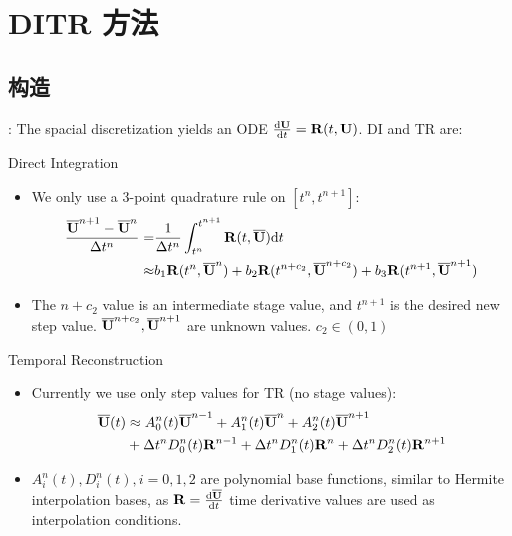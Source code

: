 \documentclass[aspectratio=169,serif]{beamer} %
\begin{document}
\section{DITR 方法}
\subsection{构造}


\begin{frame}[allowframebreaks]{\secname: \subsecname}
  The spacial discretization yields an ODE $\dv{\mathbf{U}}{t}=\mathbf{R}(t,\mathbf{U})$.
  DI and TR are:
  \begin{block}{Direct Integration}
    \begin{itemize}
      \item We only use a 3-point quadrature
            rule on $[t^n,t^{n+1}]$:
            \begin{equation}
              \label{eq:Quad3}
              \begin{aligned}
                \frac{\overline{\mathbf{U}}^{n+1} - \overline{\mathbf{U}}^{n}}{{\Delta} t^n} = & \frac{1}{{\Delta} t^n}
                \int_{t^n}^{t^{n+1}}{
                \mathbf{R}(t, \overline{\mathbf{U}}) \dd t
                }                                                           \\ \approx &
                b_1\mathbf{R}(t^n, \overline{\mathbf{U}}^n)
                +
                b_2\mathbf{R}(t^{n+c_2}, \overline{\mathbf{U}}^{n+c_2})
                +
                b_3\mathbf{R}(t^{n+1}, \overline{\mathbf{U}}^{n+1})
              \end{aligned}
            \end{equation}
      \item The ${n+c_2}$ value is an intermediate stage value, and $t^{n+1}$ is the desired new step value.
            $\overline{\mathbf{U}}^{n+c_2},\overline{\mathbf{U}}^{n+1}$ are unknown values.
            $c_2\in (0,1)$
    \end{itemize}
  \end{block}


  \begin{block}{Temporal Reconstruction}
    \begin{itemize}
      \item Currently we use only step values for TR (no stage values):
            \begin{equation}
              \begin{aligned}
                \label{eq:TR}
                \overline{\mathbf{U}}(t) & \approx
                A^n_0(t)\overline{\mathbf{U}}^{n - 1} +
                A^n_1(t)\overline{\mathbf{U}}^{n} +
                A^n_2(t)\overline{\mathbf{U}}^{n + 1}
                \\ & +
                {\Delta} t^n D^n_0(t)\mathbf{R}^{n - 1} +
                {\Delta} t^n D^n_1(t)\mathbf{R}^{n} +
                {\Delta} t^n D^n_2(t)\mathbf{R}^{n + 1}
              \end{aligned}
            \end{equation}
      \item $A^n_i(t), D^n_i(t), i=0,1,2$
            are polynomial base functions, similar to Hermite
            interpolation bases, as $\mathbf{R}=\dv{\overline{\mathbf{U}}}{t}$ time derivative values are
            used as interpolation conditions.
    \end{itemize}
  \end{block}
  \pagebreak


\end{frame}
\end{document}
